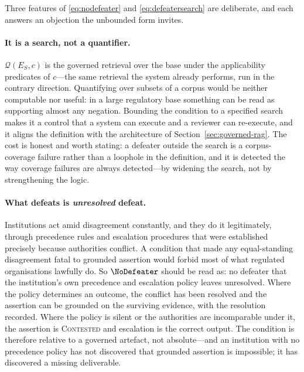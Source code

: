 Three features of \eqref{eq:nodefeater} and \eqref{eq:defeatersearch} are deliberate,
and each answers an objection the unbounded form invites.

\paragraph{It is a search, not a quantifier.} $\mathcal{Q}(E_S, c)$ is the governed
retrieval over the base under the applicability predicates of $c$---the same retrieval
the system already performs, run in the contrary direction. Quantifying over subsets of
a corpus would be neither computable nor useful: in a large regulatory base something
can be read as supporting almost any negation. Bounding the condition to a specified
search makes it a control that a system can execute and a reviewer can re-execute, and
it aligns the definition with the architecture of
Section~\ref{sec:governed-rag}. The cost is honest and worth stating: a defeater outside
the search is a corpus-coverage failure rather than a loophole in the definition, and it
is detected the way coverage failures are always detected---by widening the search, not
by strengthening the logic.

\paragraph{What defeats is \emph{unresolved} defeat.} Institutions act amid
disagreement constantly, and they do it legitimately, through precedence rules and
escalation procedures that were established precisely because authorities conflict. A
condition that made any equal-standing disagreement fatal to grounded assertion would
forbid most of what regulated organisations lawfully do. So $\NoDefeater$ should be read
as: no defeater that the institution's own precedence and escalation policy leaves
unresolved. Where the policy determines an outcome, the conflict has been resolved and
the assertion can be grounded on the surviving evidence, with the resolution recorded.
Where the policy is silent or the authorities are incomparable under it, the assertion is
\textsc{Contested} and escalation is the correct output. The condition is therefore
relative to a governed artefact, not absolute---and an institution with no precedence
policy has not discovered that grounded assertion is impossible; it has discovered a
missing deliverable.

